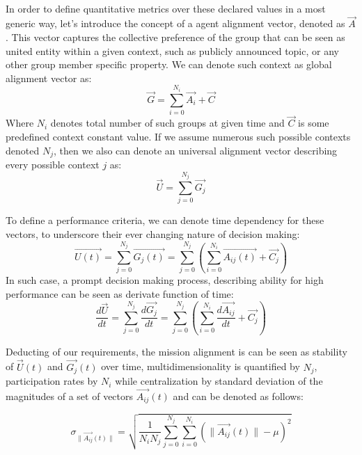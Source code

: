 \documentclass{article}
\begin{document}
\begin{CJK}{UTF8}{gbsn}
\begin{multicols}{2}
        \paragraph*{}
        In order to define quantitative metrics over these declared values in a most generic way, let's introduce the concept of a agent alignment vector, denoted as  $\vec{A}$. This vector captures the collective preference of the group that can be seen as united entity within a given context, such as publicly announced topic, or any other group member specific property. We can denote such context as global alignment vector as:
        \begin{equation}
            \label{eq:glob-align}
            \vec{G} = \sum_{i=0}^{N_{i}} \vec{A_i} + \vec{C}
        \end{equation} Where $N_i$ denotes total number of such groups at given time and $\vec{C}$ is some predefined context constant value.
        If we assume numerous such possible contexts denoted ${N_j}$, then we also can denote an universal alignment vector describing every possible context $j$ as:
        \begin{equation}
            \vec{U} = \sum_{j=0}^{N_{j}} \vec{G_j}
        \end{equation}

        To define a performance criteria, we can denote time dependency for these vectors, to underscore their ever changing nature of decision making:
        \begin{equation}
            \vec{U(t)} = \sum_{j=0}^{N_{j}} \vec{G_j(t)} = \sum_{j=0}^{N_{j}}(\sum_{i=0}^{N_{i}} \vec{A_{ij}(t)} + \vec{C_j})
        \end{equation}
        In such case, a prompt decision making process,  describing ability for high performance can be seen as derivate function of time:
        \begin{equation}
            \frac{d\vec{U}}{dt} = \sum_{j=0}^{N_{j}} \frac{d\vec{G_j}}{dt} = \sum_{j=0}^{N_{j}} (\sum_{i=0}^{N_{i}} \frac{d\vec{A_{ij}}}{dt} + \vec{C_j})
        \end{equation}

        Deducting of our requirements, the mission alignment is can be seen as stability of $\vec{U}(t)$ and $\vec{G_j}(t)$ over time, multidimensionality is quantified by ${N_j}$,  participation rates by $N_i$ while centralization by standard deviation of the magnitudes of a set of vectors $\vec{A_{ij}}(t)$ and can be denoted as follows:

        \begin{equation}
            \sigma_{\|\vec{A_{ij}}(t)\|} = \sqrt{\frac{1}{N_{i}N_{j}} \sum_{j=0}^{N_{j}} \sum_{i=0}^{N_{i}} \left( \|\vec{A_{ij}}(t)\| - \mu \right)^2}
        \end{equation}


\end{multicols}
\end{CJK}
\end{document}
